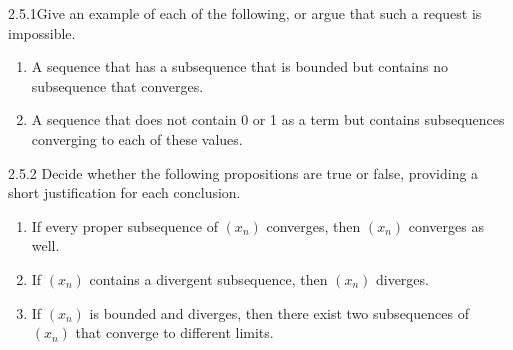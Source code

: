 \begin{exercise}
    {2.5.1}Give an example of each of the following, or argue that such a request is impossible.
    \begin{enumerate}
        \item A sequence that has a subsequence that is bounded but contains no subsequence that converges.
        \item A sequence that does not contain 0 or 1 as a term but contains subsequences converging to each of these values.
    \end{enumerate}
\end{exercise}


\begin{exercise}
    {2.5.2} Decide whether the following propositions are true or false, providing a short justification for each conclusion.
    \begin{enumerate}
        \item If every proper subsequence of \((x_n)\) converges, then \((x_n)\) converges as well.
        \item If \((x_{n})\) contains a divergent subsequence, then \((x_n)\) diverges.
        \item If \((x_n)\) is bounded and diverges, then there exist two subsequences of \((x_n)\) that converge to different limits.
    \end{enumerate}
\end{exercise}

